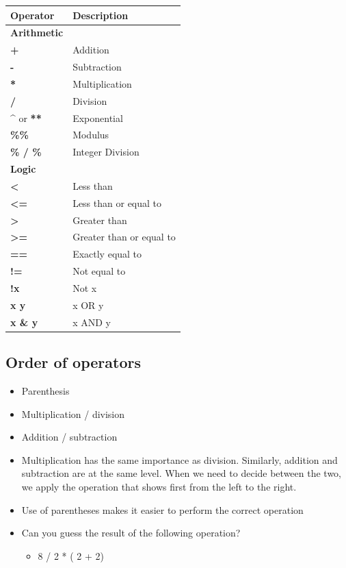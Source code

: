 \documentclass[
  letterpaper,
  DIV=11,
  numbers=noendperiod]{scrreprt}
\providecommand{\tightlist}{%
  \setlength{\itemsep}{0pt}\setlength{\parskip}{0pt}}\usepackage{longtable,booktabs,array}
\begin{document}
\begin{longtable}[]{@{}ll@{}}
\toprule\noalign{}
\textbf{Operator} & \textbf{Description} \\
\midrule\noalign{}
\endhead
\bottomrule\noalign{}
\endlastfoot
\textbf{Arithmetic} & \\
\textbf{+} & Addition \\
\textbf{-} & Subtraction \\
\textbf{*} & Multiplication \\
\textbf{/} & Division \\
\textbf{\^{}} or \textbf{**} & Exponential \\
\textbf{\%\%} & Modulus \\
\textbf{\% / \%} & Integer Division \\
\textbf{Logic} & \\
\textbf{\textless{}} & Less than \\
\textbf{\textless=} & Less than or equal to \\
\textbf{\textgreater{}} & Greater than \\
\textbf{\textgreater=} & Greater than or equal to \\
\textbf{==} & Exactly equal to \\
\textbf{!=} & Not equal to \\
\textbf{!x} & Not x \\
\textbf{x \textbar{} y} & x OR y \\
\textbf{x \& y} & x AND y \\
\end{longtable}

\subsection{Order of operators}\label{order-of-operators}

\begin{itemize}
\item
  Parenthesis
\item
  Multiplication / division
\item
  Addition / subtraction
\item
  Multiplication has the same importance as division. Similarly,
  addition and subtraction are at the same level. When we need to decide
  between the two, we apply the operation that shows first from the left
  to the right.
\item
  Use of parentheses makes it easier to perform the correct operation
\item
  Can you guess the result of the following operation?

  \begin{itemize}
  \tightlist
  \item
    8 / 2 * ( 2 + 2)
  \end{itemize}
\end{itemize}
\end{document}
